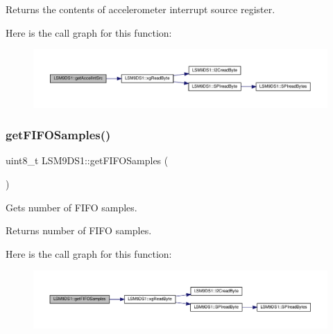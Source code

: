 \begin{DoxyReturn}{Returns}
the contents of accelerometer interrupt source register. 
\end{DoxyReturn}
Here is the call graph for this function\+:
\nopagebreak
\begin{figure}[H]
\begin{center}
\leavevmode
\includegraphics[width=350pt]{classLSM9DS1_ae42ae3b368370f977d090ba0e53c7f5c_cgraph}
\end{center}
\end{figure}
\mbox{\label{classLSM9DS1_ac03ef2ff928a25c4a80af7707cd92dc8}} 
\subsubsection{\texorpdfstring{get\+F\+I\+F\+O\+Samples()}{getFIFOSamples()}}
{\footnotesize\ttfamily uint8\+\_\+t L\+S\+M9\+D\+S1\+::get\+F\+I\+F\+O\+Samples (\begin{DoxyParamCaption}{ }\end{DoxyParamCaption})}



Gets number of F\+I\+FO samples. 

\begin{DoxyReturn}{Returns}
number of F\+I\+FO samples. 
\end{DoxyReturn}
Here is the call graph for this function\+:
\nopagebreak
\begin{figure}[H]
\begin{center}
\leavevmode
\includegraphics[width=350pt]{classLSM9DS1_ac03ef2ff928a25c4a80af7707cd92dc8_cgraph}
\end{center}
\end{figure}
\mbox{\label{classLSM9DS1_aaba6696754df62a411a6a190100f9ca3}} 
